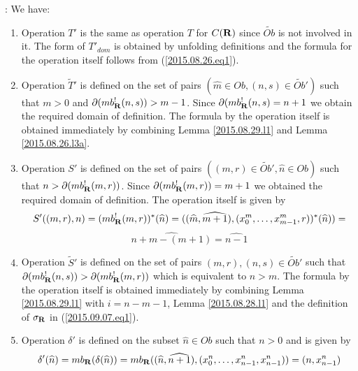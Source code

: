 \documentclass[11pt]{article}
\newenvironment{proof}{{\bf Proof}:}{\vskip 5mm }
\newcommand{\rr}{{\bf R}}
\newcommand{\wt}{\widetilde}
\newcommand{\wh}{\widehat}
\begin{document}
\begin{proof}
We have:
%
\begin{enumerate}
%
\item Operation $T'$ is the same as operation $T$ for $C(\rr)$ since $\wt{Ob}$ is not involved in it. The form of $T'_{dom}$ is obtained by unfolding definitions and the formula for the operation itself follows from (\ref{2015.08.26.eq1}).
%
\item Operation $\wt{T}'$ is defined on the set of pairs $(\wh{m}\in Ob, (n,s)\in \wt{Ob}')$ such that $m>0$ and $\partial(mb_{\rr}^!(n,s))>m-1$. Since $\partial(mb_{\rr}^!(n,s)=n+1$ we obtain the required domain of definition. The formula by the operation itself is obtained immediately by combining Lemma \ref{2015.08.29.l1} and Lemma \ref{2015.08.26.l3a}.
%
\item Operation $S'$ is defined on the set of pairs $((m,r)\in \wt{Ob}',\wh{n}\in Ob)$ such that $n>\partial(mb_{\rr}^!(m,r))$. Since $\partial(mb_{\rr}^!(m,r))=m+1$ we obtained the required domain of definition. The operation itself is given by
%
$$S'((m,r),n)=(mb_{\rr}^!(m,r))^*(\wh{n})=((\wh{m},\wh{m+1}),(x_0^m,\dots,x_{m-1}^m,r))^*(\wh{n}))=$$
$$\wh{n+m-(m+1)}=\wh{n-1}$$
%
\item Operation $\wt{S}'$ is defined on the set of pairs $(m,r),(n,s)\in \wt{Ob}'$ 
such that $\partial(mb_{\rr}^!(n,s))>\partial(mb_{\rr}^!(m,r))$ which is equivalent to $n>m$. The formula by the operation itself is obtained immediately by combining Lemma \ref{2015.08.29.l1} with $i=n-m-1$, Lemma \ref{2015.08.28.l1} and the definition of $\sigma_{\rr}$ in (\ref{2015.09.07.eq1}). 
%
\item Operation $\delta'$ is defined on the subset $\wh{n}\in Ob$ such that $n>0$ and is given by
%
$$\delta'(\wh{n})=mb_{\rr}(\delta(\wh{n}))=mb_{\rr}((\wh{n},\wh{n+1}),(x_0^n,\dots,x_{n-1}^n,x_{n-1}^n))=(n,x_{n-1}^n)$$
%
\end{enumerate}
\end{proof}
%
\end{document}
